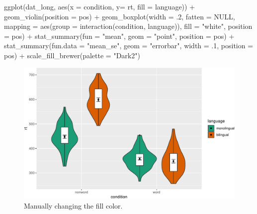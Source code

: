 \documentclass[
  english,
  doc,floatsintext]{apa6}
\newenvironment{Shaded}{\begin{snugshade}}{\end{snugshade}}
\newcommand{\AttributeTok}[1]{\textcolor[rgb]{0.77,0.63,0.00}{#1}}
\newcommand{\ConstantTok}[1]{\textcolor[rgb]{0.00,0.00,0.00}{#1}}
\newcommand{\DecValTok}[1]{\textcolor[rgb]{0.00,0.00,0.81}{#1}}
\newcommand{\FunctionTok}[1]{\textcolor[rgb]{0.00,0.00,0.00}{#1}}
\newcommand{\NormalTok}[1]{#1}
\newcommand{\SpecialCharTok}[1]{\textcolor[rgb]{0.00,0.00,0.00}{#1}}
\newcommand{\StringTok}[1]{\textcolor[rgb]{0.31,0.60,0.02}{#1}}
\begin{document}
\begin{Shaded}
\begin{Highlighting}[]
\FunctionTok{ggplot}\NormalTok{(dat\_long, }\FunctionTok{aes}\NormalTok{(}\AttributeTok{x =}\NormalTok{ condition, }\AttributeTok{y=}\NormalTok{ rt, }\AttributeTok{fill =}\NormalTok{ language)) }\SpecialCharTok{+}
  \FunctionTok{geom\_violin}\NormalTok{(}\AttributeTok{position =}\NormalTok{ pos) }\SpecialCharTok{+}
  \FunctionTok{geom\_boxplot}\NormalTok{(}\AttributeTok{width =}\NormalTok{ .}\DecValTok{2}\NormalTok{, }\AttributeTok{fatten =} \ConstantTok{NULL}\NormalTok{, }
               \AttributeTok{mapping =} \FunctionTok{aes}\NormalTok{(}\AttributeTok{group =} \FunctionTok{interaction}\NormalTok{(condition, language)),}
               \AttributeTok{fill =} \StringTok{"white"}\NormalTok{,}
               \AttributeTok{position =}\NormalTok{ pos) }\SpecialCharTok{+}
  \FunctionTok{stat\_summary}\NormalTok{(}\AttributeTok{fun =} \StringTok{"mean"}\NormalTok{, }
               \AttributeTok{geom =} \StringTok{"point"}\NormalTok{, }
               \AttributeTok{position =}\NormalTok{ pos) }\SpecialCharTok{+}
  \FunctionTok{stat\_summary}\NormalTok{(}\AttributeTok{fun.data =} \StringTok{"mean\_se"}\NormalTok{, }
               \AttributeTok{geom =} \StringTok{"errorbar"}\NormalTok{, }
               \AttributeTok{width =}\NormalTok{ .}\DecValTok{1}\NormalTok{,}
               \AttributeTok{position =}\NormalTok{ pos) }\SpecialCharTok{+}
  \FunctionTok{scale\_fill\_brewer}\NormalTok{(}\AttributeTok{palette =} \StringTok{"Dark2"}\NormalTok{)}
\end{Highlighting}
\end{Shaded}

\begin{figure}

{\centering \includegraphics[width=1\linewidth]{images/viobox5-1} 

}

\caption{Manually changing the fill color.}\label{fig:viobox5}
\end{figure}
\end{document}
